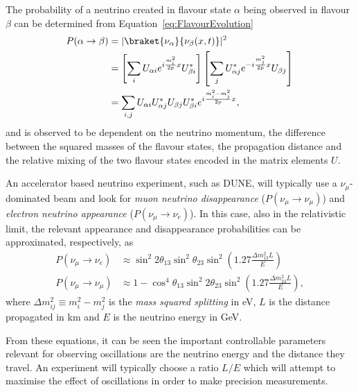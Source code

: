 The probability of a neutrino created in flavour state $\alpha$ being observed in flavour $\beta$ can be determined from Equation~\ref{eq:FlavourEvolution}
\begin{align}
  P(\alpha \rightarrow \beta) &= |\braket{\nu_{\alpha}}{\nu_{\beta}(x,t)}|^2 \\
  &= \left[ \sum_i U_{\alpha i} e^{i \frac{m_i^2}{2p} x} U_{\beta i}^* \right] \left[ \sum_j U_{\alpha j}^* e^{-i \frac{m_j^2}{2p} x} U_{\beta j} \right] \\
  &= \sum_{i,j} U_{\alpha i} U_{\alpha j}^* U_{\beta j} U_{\beta i}^* e^{i \frac{m_i^2-m_j^2}{2p} x},
\end{align}
and is observed to be dependent on the neutrino momentum, the difference between the squared masses of the flavour states, the propagation distance and the relative mixing of the two flavour states encoded in the matrix elements $U$.

An accelerator based neutrino experiment, such as DUNE, will typically use a $\nu_{\mu}$-dominated beam and look for \textit{muon neutrino disappearance} ($P(\nu_{\mu}\rightarrow \nu_{\mu})$) and \textit{electron neutrino appearance} ($P(\nu_{\mu}\rightarrow \nu_e)$).  In this case, also in the relativistic limit, the relevant appearance and disappearance probabilities can be approximated, respectively, as
\begin{align}
  \label{eq:ElectronNeutrinoAppearance} P(\nu_{\mu} \rightarrow \nu_e) &\approx \sin^2{2\theta_{13}} \sin^2{\theta_{23}} \sin^2 {\left( 1.27 \frac{\Delta m_{13}^2 L}{E} \right)} \\
  \label{eq:MuonNeutrinoDisappearance} P(\nu_{\mu} \rightarrow \nu_{\mu}) &\approx 1 - \cos^4{\theta_{13}} \sin^2{2\theta_{23}} \sin^2{ \left( 1.27 \frac{\Delta m_{23}^2 L}{E} \right) },
\end{align}
where $\Delta m_{ij}^2 \equiv m_i^2-m_j^2$ is the \textit{mass squared splitting} in eV, $L$ is the distance propagated in km and $E$ is the neutrino energy in GeV.

From these equations, it can be seen the important controllable parameters relevant for observing oscillations are the neutrino energy and the distance they travel.  An experiment will typically choose a ratio $L/E$ which will attempt to maximise the effect of oscillations in order to make precision measurements.

